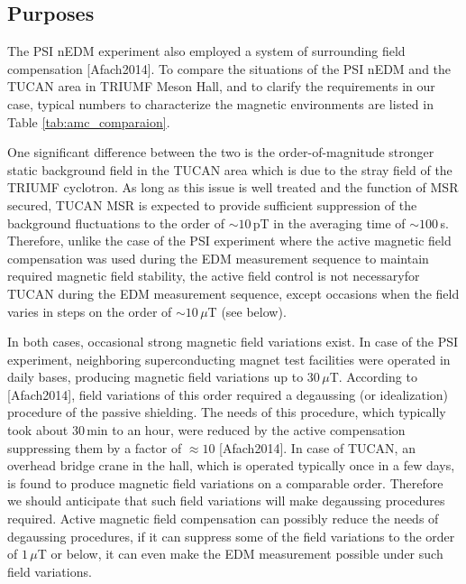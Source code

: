 



\subsection{Purposes}

The PSI nEDM experiment also employed a system of surrounding field compensation [Afach2014]. To compare the situations of the PSI nEDM and the TUCAN area in  TRIUMF Meson Hall, and to clarify the requirements in our case, typical numbers to characterize the magnetic environments are listed  in Table \ref{tab:amc_comparaion}. 

One significant difference between the two is the order-of-magnitude stronger static background field in the TUCAN area which is due to the stray field of the TRIUMF cyclotron. As long as this issue is well treated and the function of MSR secured, TUCAN MSR is expected to provide sufficient suppression of the background fluctuations to the order of $\sim10\,$pT in the averaging time of $\sim 100\,$s. 
Therefore, unlike the case of the PSI experiment where the active magnetic field compensation was used during the EDM measurement sequence to maintain required magnetic field stability, the active field control is not necessaryfor TUCAN during the EDM measurement sequence, except occasions when the field varies in steps on the order of $\sim 10\,\mu$T (see below).

In both cases, occasional strong magnetic field variations exist. In case of the PSI experiment, neighboring superconducting magnet test facilities were operated in daily bases,  producing magnetic field variations up to $30\,\mu$T. According to [Afach2014],  field variations of this order required a degaussing (or idealization) procedure of the passive shielding. The needs of this procedure, which typically took about 30\,min to an hour, were reduced by the active compensation suppressing them by a factor of $\approx10$ [Afach2014]. In case of TUCAN, an overhead bridge crane in the hall, which is operated typically once in a few days, is found to produce magnetic field variations on a comparable order. Therefore we should anticipate that such field variations will make degaussing procedures required. Active magnetic field compensation can possibly reduce the needs of degaussing procedures, if it can suppress some of the field variations to the order of $1\,\mu$T or below, it can even make the EDM measurement possible under such field variations.

